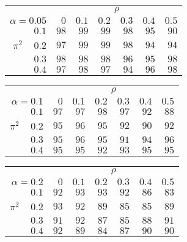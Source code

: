 \begin{tabular}{r|rrrrrr}
\hline\hline
 &\multicolumn{6}{c}{$\rho$} \\ 
 $\alpha = 0.05$ & $0$ & $0.1$ & $0.2$ & $0.3$ & $0.4$ & $0.5$ \\ 
 \hline$0.1$ & $98$ & $99$ & $99$ & $98$ & $95$ & $90$\\ 
$\pi^2\;\;\;$ $0.2$ & $97$ & $99$ & $99$ & $98$ & $94$ & $94$\\ 
$0.3$ & $98$ & $98$ & $98$ & $96$ & $95$ & $98$\\ 
$0.4$ & $97$ & $98$ & $97$ & $94$ & $96$ & $98$\\ 
 \hline 
 \end{tabular}
 
 \vspace{2em} 
 
\begin{tabular}{r|rrrrrr}
\hline\hline
 &\multicolumn{6}{c}{$\rho$} \\ 
 $\alpha = 0.1$ & $0$ & $0.1$ & $0.2$ & $0.3$ & $0.4$ & $0.5$ \\ 
 \hline$0.1$ & $97$ & $97$ & $98$ & $97$ & $92$ & $88$\\ 
$\pi^2\;\;\;$ $0.2$ & $95$ & $96$ & $95$ & $92$ & $90$ & $92$\\ 
$0.3$ & $95$ & $96$ & $95$ & $91$ & $94$ & $96$\\ 
$0.4$ & $95$ & $95$ & $92$ & $93$ & $95$ & $95$\\ 
 \hline 
 \end{tabular}
 
 \vspace{2em} 
 
\begin{tabular}{r|rrrrrr}
\hline\hline
 &\multicolumn{6}{c}{$\rho$} \\ 
 $\alpha = 0.2$ & $0$ & $0.1$ & $0.2$ & $0.3$ & $0.4$ & $0.5$ \\ 
 \hline$0.1$ & $92$ & $93$ & $93$ & $92$ & $86$ & $83$\\ 
$\pi^2\;\;\;$ $0.2$ & $93$ & $92$ & $89$ & $85$ & $85$ & $89$\\ 
$0.3$ & $91$ & $92$ & $87$ & $85$ & $88$ & $91$\\ 
$0.4$ & $92$ & $89$ & $84$ & $87$ & $90$ & $90$\\ 
 \hline 
 \end{tabular}